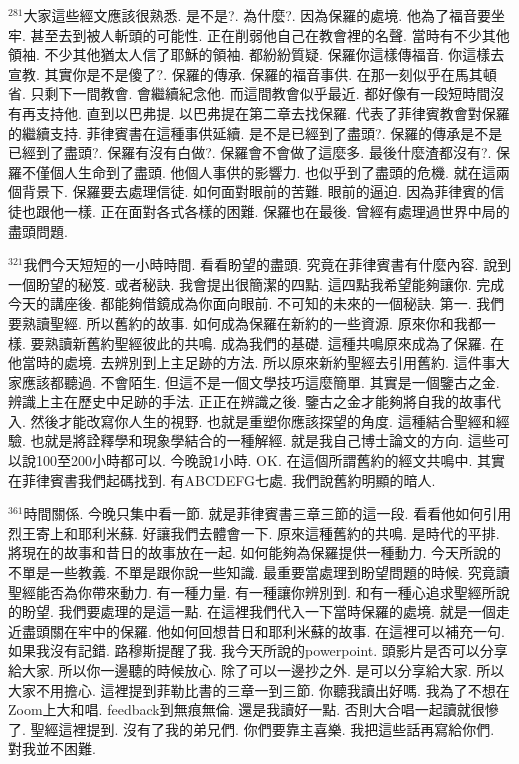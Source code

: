 \documentclass{book}
\begin{document}
$^{281}$大家這些經文應該很熟悉.
是不是?.
為什麼?.
因為保羅的處境.
他為了福音要坐牢.
甚至去到被人斬頭的可能性.
正在削弱他自己在教會裡的名聲.
當時有不少其他領袖.
不少其他猶太人信了耶穌的領袖.
都紛紛質疑.
保羅你這樣傳福音.
你這樣去宣教.
其實你是不是傻了?.
保羅的傳承.
保羅的福音事供.
在那一刻似乎在馬其頓省.
只剩下一間教會.
會繼續紀念他.
而這間教會似乎最近.
都好像有一段短時間沒有再支持他.
直到以巴弗提.
以巴弗提在第二章去找保羅.
代表了菲律賓教會對保羅的繼續支持.
菲律賓書在這種事供延續.
是不是已經到了盡頭?.
保羅的傳承是不是已經到了盡頭?.
保羅有沒有白做?.
保羅會不會做了這麼多.
最後什麼渣都沒有?.
保羅不僅個人生命到了盡頭.
他個人事供的影響力.
也似乎到了盡頭的危機.
就在這兩個背景下.
保羅要去處理信徒.
如何面對眼前的苦難.
眼前的逼迫.
因為菲律賓的信徒也跟他一樣.
正在面對各式各樣的困難.
保羅也在最後.
曾經有處理過世界中局的盡頭問題.

$^{321}$我們今天短短的一小時時間.
看看盼望的盡頭.
究竟在菲律賓書有什麼內容.
說到一個盼望的秘笈.
或者秘訣.
我會提出很簡潔的四點.
這四點我希望能夠讓你.
完成今天的講座後.
都能夠借鏡成為你面向眼前.
不可知的未來的一個秘訣.
第一.
我們要熟讀聖經.
所以舊約的故事.
如何成為保羅在新約的一些資源.
原來你和我都一樣.
要熟讀新舊約聖經彼此的共鳴.
成為我們的基礎.
這種共鳴原來成為了保羅.
在他當時的處境.
去辨別到上主足跡的方法.
所以原來新約聖經去引用舊約.
這件事大家應該都聽過.
不會陌生.
但這不是一個文學技巧這麼簡單.
其實是一個鑒古之金.
辨識上主在歷史中足跡的手法.
正正在辨識之後.
鑒古之金才能夠將自我的故事代入.
然後才能改寫你人生的視野.
也就是重塑你應該探望的角度.
這種結合聖經和經驗.
也就是將詮釋學和現象學結合的一種解經.
就是我自己博士論文的方向.
這些可以說100至200小時都可以.
今晚說1小時.
OK.
在這個所謂舊約的經文共鳴中.
其實在菲律賓書我們起碼找到.
有ABCDEFG七處.
我們說舊約明顯的暗人.

$^{361}$時間關係.
今晚只集中看一節.
就是菲律賓書三章三節的這一段.
看看他如何引用烈王寄上和耶利米蘇.
好讓我們去體會一下.
原來這種舊約的共鳴.
是時代的平排.
將現在的故事和昔日的故事放在一起.
如何能夠為保羅提供一種動力.
今天所說的不單是一些教義.
不單是跟你說一些知識.
最重要當處理到盼望問題的時候.
究竟讀聖經能否為你帶來動力.
有一種力量.
有一種讓你辨別到.
和有一種心追求聖經所說的盼望.
我們要處理的是這一點.
在這裡我們代入一下當時保羅的處境.
就是一個走近盡頭關在牢中的保羅.
他如何回想昔日和耶利米蘇的故事.
在這裡可以補充一句.
如果我沒有記錯.
路穆斯提醒了我.
我今天所說的powerpoint.
頭影片是否可以分享給大家.
所以你一邊聽的時候放心.
除了可以一邊抄之外.
是可以分享給大家.
所以大家不用擔心.
這裡提到菲勒比書的三章一到三節.
你聽我讀出好嗎.
我為了不想在Zoom上大和唱.
feedback到無痕無倫.
還是我讀好一點.
否則大合唱一起讀就很慘了.
聖經這裡提到.
沒有了我的弟兄們.
你們要靠主喜樂.
我把這些話再寫給你們.
對我並不困難.
\end{document}
